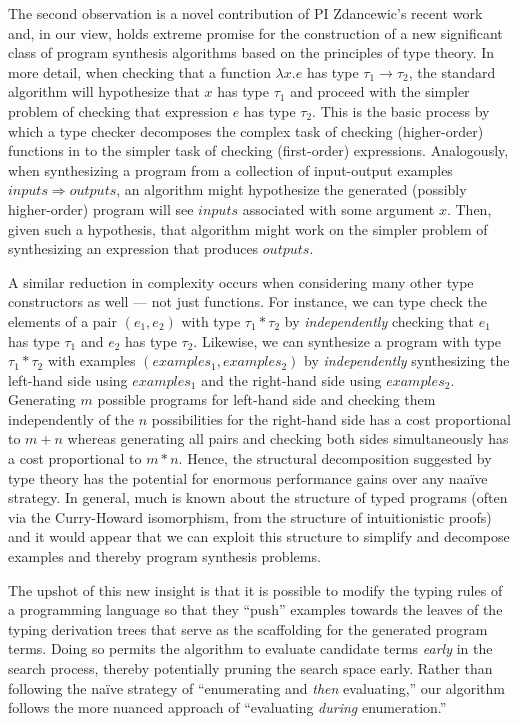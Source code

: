 The second observation is a novel contribution of PI Zdancewic's recent work~\cite{OZ15}
and, in our view, holds
extreme promise for the construction of a new significant class of
program synthesis algorithms based on the principles of type theory.
In more detail, when checking that a function 
$\lambda x.e$ has type $\tau_1 \rightarrow \tau_2$, the standard algorithm will
hypothesize that $x$ has type $\tau_1$ and proceed with the simpler
problem of checking that expression $e$ has type $\tau_2$.  This is the
basic process by which a type checker decomposes the complex task of
checking (higher-order) functions in to the simpler task of checking
(first-order) expressions.  Analogously, when synthesizing a program
from a collection of input-output examples $\mathit{inputs}
\Rightarrow \mathit{outputs}$, an algorithm might hypothesize the
generated (possibly higher-order) program will see $\mathit{inputs}$
associated with some argument $x$.  Then, given such a hypothesis,
that algorithm might work on the simpler problem of synthesizing an
expression that produces $\mathit{outputs}$.  

A similar reduction
in complexity occurs when considering many other type constructors
as well --- not just functions.  For instance, we can type check the elements of a pair 
$(e_1, e_2)$ with type
$\tau_1 * \tau_2$ by \emph{independently} checking that $e_1$ has
type $\tau_1$ and $e_2$ has type $\tau_2$.  Likewise, we can
synthesize a program with type $\tau_1 * \tau_2$ with examples
$(\mathit{examples_1}, \mathit{examples_2})$ by \emph{independently}
synthesizing the left-hand side using $\mathit{examples_1}$ and
the right-hand side using $\mathit{examples_2}$.  Generating
$m$ possible programs for left-hand side and checking them
independently of
the $n$ possibilities for the right-hand side has a cost proportional to
$m + n$ whereas generating all pairs and checking both sides
simultaneously has a cost proportional to $m * n$.  Hence, the structural
decomposition suggested by type theory has the potential for enormous
performance gains over any naa\"{i}ve strategy.  In general, much is known about 
the structure of typed programs (often via  
the Curry-Howard isomorphism, from the structure of 
intuitionistic proofs) and it would appear that we can exploit
this structure to simplify and decompose examples
and thereby program synthesis problems.

The upshot of this new insight is that it is possible to modify the
typing rules of a programming language so that they ``push'' examples
towards the leaves of the typing derivation trees that serve as the
scaffolding for the generated program terms.  Doing so permits the
algorithm to evaluate candidate terms \textit{early} in the search
process, thereby potentially pruning the search space early.  Rather
than following the na\"{i}ve strategy of ``enumerating and
\textit{then} evaluating,'' our algorithm follows the more nuanced
approach of ``evaluating \textit{during} enumeration.''


